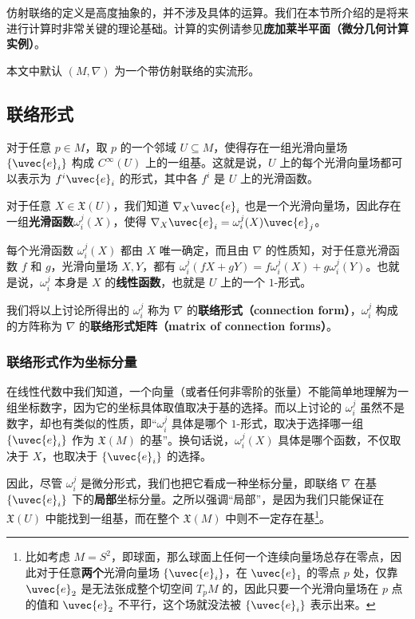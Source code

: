 

仿射联络的定义是高度抽象的，并不涉及具体的运算。我们在本节所介绍的是将来进行计算时非常关键的理论基础。计算的实例请参见\textbf{庞加莱半平面（微分几何计算实例）}。

本文中默认 $(M, \nabla)$ 为一个带仿射联络的实流形。

\subsection{联络形式}

对于任意 $p\in M$，取 $p$ 的一个邻域 $U\subseteq M$，使得存在一组光滑向量场 $\{\uvec{e}_i\}$ 构成 $C^{\infty}(U)$ 上的一组基。这就是说，$U$ 上的每个光滑向量场都可以表示为 $f^i\uvec{e}_i$ 的形式，其中各 $f^i$ 是 $U$ 上的光滑函数。

对于任意 $X\in\mathfrak{X}(U)$，我们知道 $\nabla_X\uvec{e}_i$ 也是一个光滑向量场，因此存在一组\textbf{光滑函数}$\omega^j_i(X)$，使得 $\nabla_X\uvec{e}_i=\omega^j_i(X)\uvec{e}_j$。

每个光滑函数 $\omega^j_i(X)$ 都由 $X$ 唯一确定，而且由 $\nabla$ 的性质知，对于任意光滑函数 $f$ 和 $g$，光滑向量场 $X, Y$，都有 $\omega^j_i(fX+gY)=f\omega^j_i(X)+g\omega^j_i(Y)$。也就是说，$\omega^j_i$ 本身是 $X$ 的\textbf{线性函数}，也就是 $U$ 上的一个 $1$-形式。

我们将以上讨论所得出的 $\omega^j_i$ 称为 $\nabla$ 的\textbf{联络形式（connection form）}，$\omega^j_i$ 构成的方阵称为 $\nabla$ 的\textbf{联络形式矩阵（matrix of connection forms）}。

\subsubsection{联络形式作为坐标分量}

在线性代数中我们知道，一个向量（或者任何非零阶的张量）不能简单地理解为一组坐标数字，因为它的坐标具体取值取决于基的选择。而以上讨论的 $\omega^j_i$ 虽然不是数字，却也有类似的性质，即“$\omega^j_i$ 具体是哪个 $1$-形式，取决于选择哪一组 $\{\uvec{e}_i\}$ 作为 $\mathfrak{X}(M)$ 的基”。换句话说，$\omega^j_i(X)$ 具体是哪个函数，不仅取决于 $X$，也取决于 $\{\uvec{e}_i\}$ 的选择。

因此，尽管 $\omega_i^j$ 是微分形式，我们也把它看成一种坐标分量，即联络 $\nabla$ 在基 $\{\uvec{e}_i\}$ 下的\textbf{局部}坐标分量。之所以强调“局部”，是因为我们只能保证在 $\mathfrak{X}(U)$ 中能找到一组基，而在整个 $\mathfrak{X}(M)$ 中则不一定存在基\footnote{比如考虑 $M=S^2$，即球面，那么球面上任何一个连续向量场总存在零点，因此对于任意\textbf{两个}光滑向量场 $\{\uvec{e}_i\}$，在 $\uvec{e}_1$ 的零点 $p$ 处，仅靠 $\uvec{e}_2$ 是无法张成整个切空间 $T_pM$ 的，因此只要一个光滑向量场在 $p$ 点的值和 $\uvec{e}_2$ 不平行，这个场就没法被 $\{\uvec{e}_i\}$ 表示出来。}。

